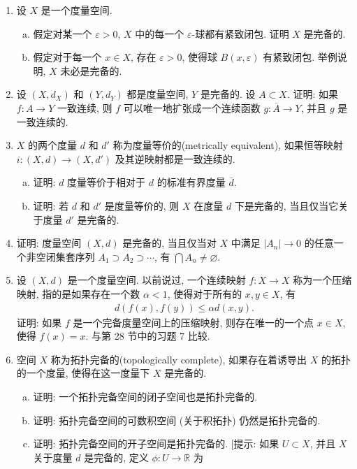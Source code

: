 \documentclass[../../main.tex]{subfiles}
\begin{document}
\begin{enumerate}
\item 设 $X$ 是一个度量空间.
\begin{enumerate}[(a)]
\item 假定对某一个 $\varepsilon>0$, $X$ 中的每一个 $\varepsilon$-球都有紧致闭包. 证明 $X$ 是完备的.
\item 假定对于每一个 $x\in X$, 存在 $\varepsilon>0$, 使得球 $B(x,\varepsilon)$ 有紧致闭包. 举例说明, $X$ 未必是完备的.
\end{enumerate}
\item 设 $(X,d_X)$ 和 $(Y,d_Y)$ 都是度量空间, $Y$ 是完备的. 设 $A\subset X$. 证明: 如果 $f\colon A\to Y$ 一致连续, 则 $f$ 可以唯一地扩张成一个连续函数 $g\colon\overline{A}\to Y$, 并且 $g$ 是一致连续的.
\item $X$ 的两个度量 $d$ 和 $d'$ 称为度量等价的(metrically equivalent), 如果恒等映射 $i\colon (X,d)\to(X,d')$ 及其逆映射都是一致连续的.
\begin{enumerate}[(a)]
\item 证明: $d$ 度量等价于相对于 $d$ 的标准有界度量 $\bar{d}$.
\item 证明: 若 $d$ 和 $d'$ 是度量等价的, 则 $X$ 在度量 $d$ 下是完备的, 当且仅当它关于度量 $d'$ 是完备的.
\end{enumerate}
\item 证明: 度量空间 $(X,d)$ 是完备的, 当且仅当对 $X$ 中满足 $|A_n|\to 0$ 的任意一个非空闭集套序列 $A_1\supset A_2\supset\cdots$, 有 $\bigcap A_n\neq\varnothing$.
\item 设 $(X,d)$ 是一个度量空间. 以前说过, 一个连续映射 $f\colon X\to X$ 称为一个压缩映射, 指的是如果存在一个数 $\alpha<1$, 使得对于所有的 $x,y\in X$, 有
\begin{align*}
d(f(x),f(y))\leqslant\alpha d(x,y).
\end{align*}
证明: 如果 $f$ 是一个完备度量空间上的压缩映射, 则存在唯一的一个点 $x\in X$, 使得 $f(x)=x$. 与第 28 节中的习题 7 比较.
\item 空间 $X$ 称为拓扑完备的(topologically complete), 如果存在着诱导出 $X$ 的拓扑的一个度量, 使得在这一度量下 $X$ 是完备的.
\begin{enumerate}[(a)]
\item 证明: 一个拓扑完备空间的闭子空间也是拓扑完备的.
\item 证明: 拓扑完备空间的可数积空间 (关于积拓扑) 仍然是拓扑完备的.
\item 证明: 拓扑完备空间的开子空间是拓扑完备的. [提示: 如果 $U\subset X$, 并且 $X$ 关于度量 $d$ 是完备的, 定义 $\phi\colon U\to\mathbb{R}$ 为

\end{enumerate}
\end{enumerate}
\end{document}
